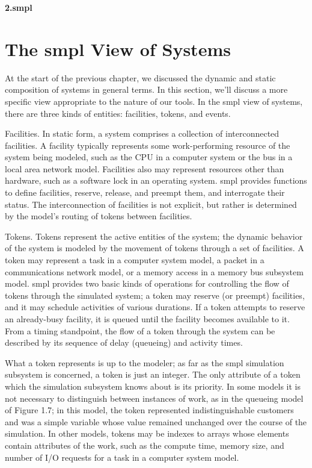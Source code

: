 \thispagestyle{empty}
\setcounter{chapter}{2}
\setcounter{section}{0}
{\sffamily\bfseries\LARGE 2.\quad smpl}\par\vspace{2em}
\section{The smpl View of Systems}
\label{sec:smpl-view-of-systems}

At the start of the previous chapter, we discussed the dynamic and static
composition of systems in general terms. In this section, we'll discuss a more
specific view appropriate to the nature of our tools. In the smpl view of
systems, there are three kinds of entities: facilities, tokens, and events.

Facilities. In static form, a system comprises a collection of interconnected
facilities. A facility typically represents some work-performing resource of
the system being modeled, such as the CPU in a computer system or the bus in a
local area network model. Facilities also may represent resources other than
hardware, such as a software lock in an operating system. smpl provides
functions to define facilities, reserve, release, and preempt them, and
interrogate their status. The interconnection of facilities is not explicit,
but rather is determined by the model's routing of tokens between facilities.

Tokens. Tokens represent the active entities of the system; the dynamic
behavior of the system is modeled by the movement of tokens through a set of
facilities. A token may represent a task in a computer system model, a packet
in a communications network model, or a memory access in a memory bus
subsystem model. smpl provides two basic kinds of operations for controlling
the flow of tokens through the simulated system; a token may reserve (or
preempt) facilities, and it may schedule activities of various durations. If a
token attempts to reserve an already-busy facility, it is queued until the
facility becomes available to it. From a timing standpoint, the flow of a
token through the system can be described by its sequence of delay (queueing)
and activity times.

What a token represents is up to the modeler; as far as the smpl simulation
subsystem is concerned, a token is just an integer. The only attribute of a
token which the simulation subsystem knows about is its
\noindent priority. In some
models it is not necessary to distinguish between instances of work, as in the
queueing model of Figure 1.7; in this model, the token represented
indistinguishable customers and was a simple variable whose value remained
unchanged over the course of the simulation. In other models, tokens may be
indexes to arrays whose elements contain attributes of the work, such as the
compute time, memory size, and number of I/O requests for a task in a computer
system model.


